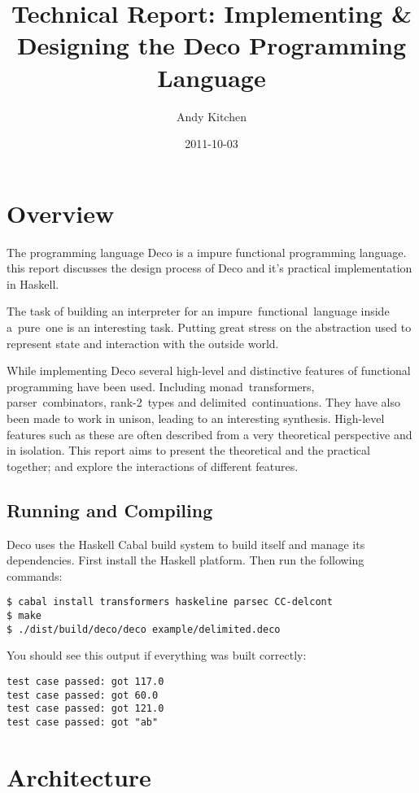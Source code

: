\documentclass[]{article}
\title{Technical Report: Implementing \& Designing the Deco Programming Language}
\author{Andy Kitchen}
\date{2011-10-03}
\begin{document}
\maketitle

\section{Overview}

The programming language Deco is a impure functional programming language.
this report discusses the design process of Deco and it's practical
implementation in Haskell.

The task of building an interpreter for an impure~functional~language inside
a~pure~one is an interesting task. Putting great stress on the abstraction
used to represent state and interaction with the outside world.

While implementing Deco several high-level and distinctive features of
functional programming have been used. Including monad~transformers,
parser~combinators, rank-2~types and delimited~continuations. They have also
been made to work in unison, leading to an interesting synthesis. High-level
features such as these are often described from a very theoretical perspective
and in isolation. This report aims to present the theoretical and the
practical together; and explore the interactions of different features.

\subsection{Running and Compiling}

Deco uses the Haskell Cabal build system to build itself and manage its
dependencies. First install the Haskell platform. Then run the following
commands:

\lstset{language=bash}
\begin{verbatim}
$ cabal install transformers haskeline parsec CC-delcont
$ make
$ ./dist/build/deco/deco example/delimited.deco 
\end{verbatim}

You should see this output if everything was built correctly:

\begin{verbatim}
test case passed: got 117.0
test case passed: got 60.0
test case passed: got 121.0
test case passed: got "ab"
\end{verbatim}

\section{Architecture}
\end{document}
